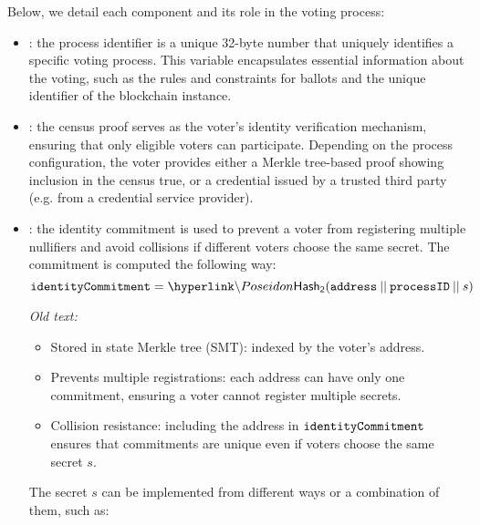 

Below, we detail each component and its role in the voting process:
\begin{itemize}
	\item \processid: the process identifier is a unique 32-byte number that uniquely identifies a specific voting process. This variable encapsulates essential information about the voting, such as the rules and constraints for ballots and the unique identifier of the \davinci blockchain instance.
	\item \censuspf: the census proof serves as the voter's identity verification mechanism, ensuring that only eligible voters can participate. Depending on the process configuration, the voter provides either a Merkle tree-based proof showing inclusion in the census true, or a credential issued by a trusted third party (e.g. from a credential service provider).
	\item \commitment: the identity commitment is used to prevent a voter from registering multiple nullifiers and avoid collisions if different voters choose the same secret. The commitment is computed the following way:
	\[ \commitment = \hlget{\Poseidon}(\address \conc \processid \conc s)\]
	{\it Old text:
	\begin{itemize}
		\item Stored in state Merkle tree (SMT): indexed by the voter's address.
		\item Prevents multiple registrations: each address can have only one commitment, ensuring a voter cannot register multiple secrets.
		\item Collision resistance: including the address in $\texttt{identityCommitment}$ ensures that commitments are unique even if voters choose the same secret $s$.
	\end{itemize}
	
	The secret $s$ can be implemented from different ways or a combination of them, such as:
	
}
\end{itemize}
